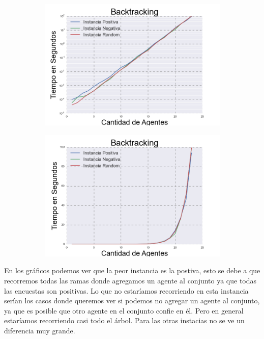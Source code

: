 \begin{figure}[h]
\begin{subfigure}{0.5\textwidth}
\includegraphics[scale=0.45]{BacktrackingLog.png}
\end{subfigure}
\begin{subfigure}{0.5\textwidth}
\includegraphics[scale=0.45]{Backtracking.png}
\end{subfigure}
\end{figure}

	En los gráficos podemos ver que la peor instancia es la postiva, esto se debe a que recorremos todas las ramas donde agregamos un agente al conjunto ya que todas las encuestas son positivas. Lo que no estaríamos recorriendo en esta instancia serían los casos donde queremos ver si podemos no agregar un agente al conjunto, ya que es posible que otro agente en el conjunto confie en él. Pero en general estaríamos recorriendo casi todo el árbol. Para las otras instacias no se ve un diferencia muy grande.
	
